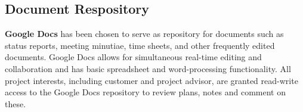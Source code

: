 \subsection{Document Respository}
\textbf{Google Docs} has been chosen to serve as repository for documents such as status reports, meeting minutiae, time sheets, and other frequently edited documents. Google Docs allows for simultaneous real-time editing and collaboration and has basic spreadsheet and word-processing functionality. All project interests, including customer and project advisor, are granted read-write access to the Google Docs repository to review plans, notes and comment on these.

